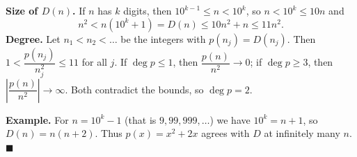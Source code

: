\textbf{Size of $D(n)$.} If $n$ has $k$ digits, then $10^{k-1}\le n<10^k$, so $n<10^k\le10n$ and
\[n^2<n(10^k+1)=D(n)\le10n^2+n\le11n^2.\]
\textbf{Degree.} Let $n_1<n_2<\dots$ be the integers with $p(n_j)=D(n_j)$. Then $1<\dfrac{p(n_j)}{n_j^2}\le11$ for all $j$. If $\deg p\le1$, then $\dfrac{p(n)}{n^2}\to0$; if $\deg p\ge3$, then $\left|\dfrac{p(n)}{n^2}\right|\to\infty$. Both contradict the bounds, so $\deg p=2$.

\textbf{Example.} For $n=10^k-1$ (that is $9,99,999,\dots$) we have $10^k=n+1$, so $D(n)=n(n+2)$. Thus $p(x)=x^2+2x$ agrees with $D$ at infinitely many $n$. $\blacksquare$
